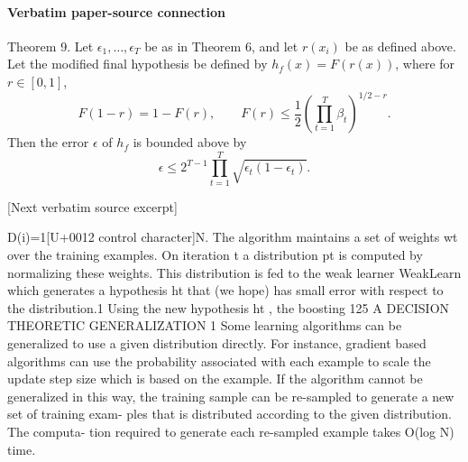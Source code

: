 \documentclass[10pt]{article}
\begin{document}
\paragraph{Verbatim paper-source connection}
\begin{ReviewVerbatim}
Theorem 9. Let $\epsilon_1,\ldots,\epsilon_T$ be as in Theorem 6, and let
$r(x_i)$ be as defined above. Let the modified final hypothesis be defined by
$h_f(x)=F(r(x))$, where for $r\in[0,1]$,
$$
F(1-r)=1-F(r),\qquad
F(r)\leq\frac12\left(\prod_{t=1}^T\beta_t\right)^{1/2-r}.
$$
Then the error $\epsilon$ of $h_f$ is bounded above by
$$
\epsilon\leq 2^{T-1}\prod_{t=1}^T\sqrt{\epsilon_t(1-\epsilon_t)}.
$$

[Next verbatim source excerpt]

D(i)=1[U+0012 control character]N. The algorithm maintains a set of weights wt
over
the training examples. On iteration t a distribution pt
is
computed by normalizing these weights. This distribution is
fed to the weak learner WeakLearn which generates a
hypothesis ht that (we hope) has small error with respect to
the distribution.1
Using the new hypothesis ht , the boosting
125
A DECISION THEORETIC GENERALIZATION
1
Some learning algorithms can be generalized to use a given distribution
directly. For instance, gradient based algorithms can use the probability
associated with each example to scale the update step size which is based
on the example. If the algorithm cannot be generalized in this way, the
training sample can be re-sampled to generate a new set of training exam-
ples that is distributed according to the given distribution. The computa-
tion required to generate each re-sampled example takes O(log N) time.


\end{ReviewVerbatim}
\end{document}
